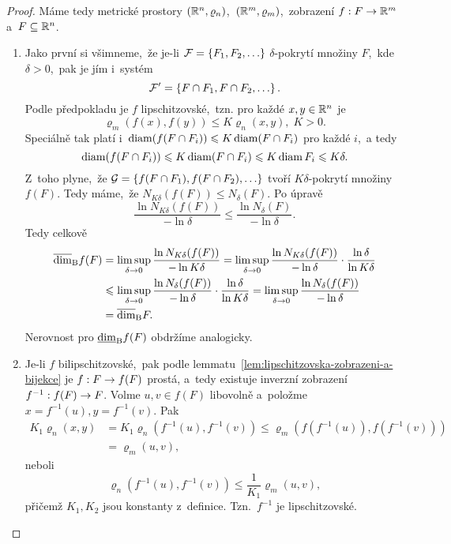\begin{proof}
    Máme tedy metrické prostory $(\mathbb{R}^n,\varrho_n)$,~$(\mathbb{R}^m,\varrho_m)$,~zobrazení $f:F \rightarrow \mathbb{R}^m$ a~$F\subseteq\mathbb{R}^n$.
    \begin{enumerate}[label=\textit{(\roman*)}]
        \item Jako první si všimneme,~že je-li $\mathcal{F}=\left\{F_1,F_2,\ldots\right\}$ $\delta$-pokrytí množiny $F$,~kde $\delta>0$,~pak je jím i~systém
        \[\mathcal{F}^\prime=\left\{F\cap F_1,F\cap F_2,\ldots\right\}.\]
        Podle předpokladu je $f$ lipschitzovské,~tzn. pro každé $x,y\in\mathbb{R}^n$ je
        \[\varrho_m(f(x),f(y))\leqslant K\varrho_n(x,y),\;K>0.\]
        Speciálně tak platí i~$\operatorname{diam}(f(F\cap F_i))\leqslant K\operatorname{diam}(F\cap F_i)$ pro každé $i$,~a tedy
        \[\operatorname{diam}(f(F\cap F_i))\leqslant K\operatorname{diam}(F\cap F_i)\leqslant K\operatorname{diam}{F_i}\leqslant K\delta.\]
        Z~toho plyne,~že $\mathcal{G}=\left\{f(F\cap F_1),f(F\cap F_2),\ldots\right\}$ tvoří $K\delta$-pokrytí množiny $f(F)$. Tedy máme,~že $N_{K\delta}(f(F))\leqslant N_\delta(F)$. Po úpravě
        \[\dfrac{\ln{N_{K\delta}(f(F))}}{-\ln{\delta}}\leqslant\dfrac{\ln{N_\delta(F)}}{-\ln{\delta}}.\]
        Tedy celkově
        \begin{align*}
            \overline{\dim}_\textup{B}{f(F)}&=\limsup_{\delta\to 0}\dfrac{\ln{N_{K\delta}(f(F))}}{-\ln{K\delta}}=\limsup_{\delta\to 0}\dfrac{\ln{N_{K\delta}(f(F))}}{-\ln{\delta}}\cdot\dfrac{\ln{\delta}}{\ln{K\delta}}\\
            &\leqslant\limsup_{\delta\to 0}\dfrac{\ln{N_{\delta}(f(F))}}{-\ln{\delta}}\cdot\dfrac{\ln{\delta}}{\ln{K\delta}}=\limsup_{\delta\to 0}\dfrac{\ln{N_{\delta}(f(F))}}{-\ln{\delta}}\\
            &=\overline{\dim}_\textup{B}{F}.
        \end{align*}
        Nerovnost pro $\underline{\dim}_\textup{B}{f(F)}$ obdržíme analogicky.
        \item Je-li $f$ bilipschitzovské,~pak podle lemmatu~\ref{lem:lipschitzovska-zobrazeni-a-bijekce} je $f:F \rightarrow f(F)$ prostá, a~tedy existuje inverzní zobrazení $f^{-1}:f(F) \rightarrow F$. Volme $u,v\in f(F)$ libovolně a~položme $x=f^{-1}(u),y=f^{-1}(v)$. Pak
        \begin{align*}
            K_1\varrho_n(x,y)&=K_1\varrho_n(f^{-1}(u),f^{-1}(v))\leqslant\varrho_m(f(f^{-1}(u)),f(f^{-1}(v)))\\
            &=\varrho_m(u,v),
        \end{align*}
        neboli
        \[\varrho_n(f^{-1}(u),f^{-1}(v))\leqslant\dfrac{1}{K_1}\varrho_m(u,v),\]
        přičemž $K_1,K_2$ jsou konstanty z~definice. Tzn.~$f^{-1}$ je lipschitzovské.


\end{enumerate}
\end{proof}
